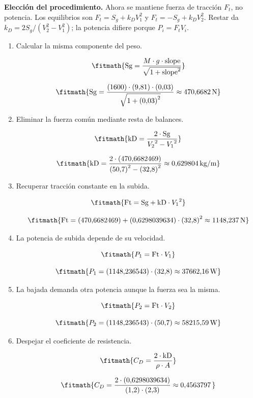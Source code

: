 \noindent\textbf{Elección del procedimiento.} Ahora se mantiene fuerza de tracción $F_t$, no potencia. Los equilibrios son $F_t=S_g+k_DV_1^2$ y $F_t=-S_g+k_DV_2^2$. Restar da $k_D=2S_g/(V_2^2-V_1^2)$; la potencia difiere porque $P_i=F_tV_i$.

\begin{enumerate}

\item Calcular la misma componente del peso.

\[\fitmath{\mathrm{Sg}=\frac{M\cdot g\cdot \mathrm{slope}}{\sqrt{1+{\mathrm{slope}}^{2}}}}\]

\[\fitmath{\mathrm{Sg}=\frac{(1600)\cdot (9{,}81)\cdot (0{,}03)}{\sqrt{1+{(0{,}03)}^{2}}}\approx 470{,}6682\,\mathrm{N}}\]

\item Eliminar la fuerza común mediante resta de balances.

\[\fitmath{\mathrm{kD}=\frac{2\cdot \mathrm{Sg}}{{V_{2}}^{2}-{V_{1}}^{2}}}\]

\[\fitmath{\mathrm{kD}=\frac{2\cdot (470{,}6682469)}{{(50{,}7)}^{2}-{(32{,}8)}^{2}}\approx 0{,}629804\,\mathrm{kg/m}}\]

\item Recuperar tracción constante en la subida.

\[\fitmath{\mathrm{Ft}=\mathrm{Sg}+\mathrm{kD}\cdot {V_{1}}^{2}}\]

\[\fitmath{\mathrm{Ft}=(470{,}6682469)+(0{,}6298039634)\cdot {(32{,}8)}^{2}\approx 1148{,}237\,\mathrm{N}}\]

\item La potencia de subida depende de su velocidad.

\[\fitmath{P_{1}=\mathrm{Ft}\cdot V_{1}}\]

\[\fitmath{P_{1}=(1148{,}236543)\cdot (32{,}8)\approx 37662{,}16\,\mathrm{W}}\]

\item La bajada demanda otra potencia aunque la fuerza sea la misma.

\[\fitmath{P_{2}=\mathrm{Ft}\cdot V_{2}}\]

\[\fitmath{P_{2}=(1148{,}236543)\cdot (50{,}7)\approx 58215{,}59\,\mathrm{W}}\]

\item Despejar el coeficiente de resistencia.

\[\fitmath{C_D=\frac{2\cdot \mathrm{kD}}{\rho\cdot A}}\]

\[\fitmath{C_D=\frac{2\cdot (0{,}6298039634)}{(1{,}2)\cdot (2{,}3)}\approx 0{,}4563797\,}\]

\end{enumerate}
